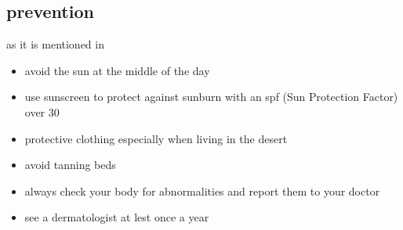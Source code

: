     \subsection{prevention}
        as it is mentioned in ~\cite{mayo2020, scfp2022} 
        \begin{itemize}
        \item avoid the sun at the middle of the day
        \item use sunscreen to protect against sunburn with an spf (Sun Protection Factor) over 30
        \item protective clothing especially when living in the desert
        \item avoid tanning beds
        \item always check your body for abnormalities and report them to your doctor
        \item see a dermatologist at lest once a year
        \end{itemize}


